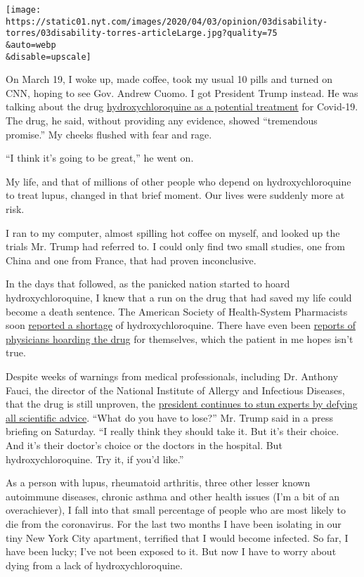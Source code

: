 \texttt{[image: https://static01.nyt.com/images/2020/04/03/opinion/03disability-torres/03disability-torres-articleLarge.jpg?quality=75\\\&auto=webp\\\&disable=upscale]}

On March 19, I woke up, made coffee, took my usual 10 pills and turned
on CNN, hoping to see Gov. Andrew Cuomo. I got President Trump instead.
He was talking about the drug
\href{https://www.nytimes.com/2020/03/19/health/coronavirus-drugs-chloroquine.html}{hydroxychloroquine
as a potential treatment} for Covid-19. The drug, he said, without
providing any evidence, showed ``tremendous promise.'' My cheeks flushed
with fear and rage.

``I think it's going to be great,'' he went on.

My life, and that of millions of other people who depend on
hydroxychloroquine to treat lupus, changed in that brief moment. Our
lives were suddenly more at risk.

I ran to my computer, almost spilling hot coffee on myself, and looked
up the trials Mr. Trump had referred to. I could only find two small
studies, one from China and one from France, that had proven
inconclusive.

In the days that followed, as the panicked nation started to hoard
hydroxychloroquine, I knew that a run on the drug that had saved my life
could become a death sentence. The American Society of Health-System
Pharmacists soon
\href{https://www.ashp.org/Drug-Shortages/Current-Shortages/Drug-Shortage-Detail.aspx?id=646}{reported
a shortage} of hydroxychloroquine. There have even been
\href{https://www.nytimes.com/2020/03/24/business/doctors-buying-coronavirus-drugs.html}{reports
of physicians hoarding the drug} for themselves, which the patient in me
hopes isn't true.

Despite weeks of warnings from medical professionals, including Dr.
Anthony Fauci, the director of the National Institute of Allergy and
Infectious Diseases, that the drug is still unproven, the
\href{https://www.nytimes.com/2020/04/05/us/politics/trump-hydroxychloroquine-coronavirus.html}{president
continues to stun experts by defying all scientific advice}. ``What do
you have to lose?'' Mr. Trump said in a press briefing on Saturday. ``I
really think they should take it. But it's their choice. And it's their
doctor's choice or the doctors in the hospital. But hydroxychloroquine.
Try it, if you'd like.''

As a person with lupus, rheumatoid arthritis, three other lesser known
autoimmune diseases, chronic asthma and other health issues (I'm a bit
of an overachiever), I fall into that small percentage of people who are
most likely to die from the coronavirus. For the last two months I have
been isolating in our tiny New York City apartment, terrified that I
would become infected. So far, I have been lucky; I've not been exposed
to it. But now I have to worry about dying from a lack of
hydroxychloroquine.

